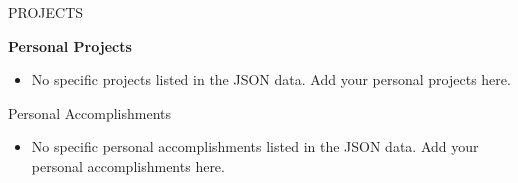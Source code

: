 \documentclass{resume} %
\begin{document}

\begin{rSection}{PROJECTS}
\vspace{-1.25em}
\item \textbf{Personal Projects}
\begin{itemize}
    \itemsep -6pt {} 
     \item No specific projects listed in the JSON data. Add your personal projects here.
 \end{itemize}
 
\end{rSection} 

\begin{rSection}{Personal Accomplishments} 
\vspace{0em}
\begin{itemize}
    \itemsep -6pt {} 
     \item No specific personal accomplishments listed in the JSON data. Add your personal accomplishments here.
 \end{itemize}


\end{rSection}

\end{document}
